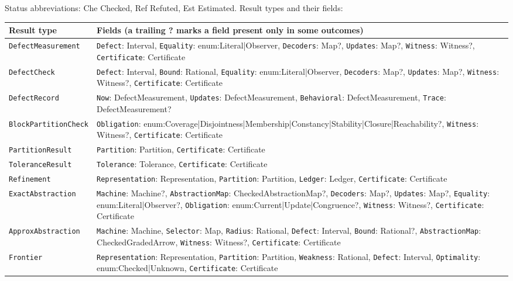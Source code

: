 \documentclass[11pt]{article}
\newcommand{\code}[1]{\texttt{#1}}
\theoremstyle{definition}
\theoremstyle{plain}
\begin{document}
Status abbreviations: Che Checked, Ref Refuted, Est Estimated. Result types and their fields:
{\footnotesize\begin{longtable}{>{\raggedright\arraybackslash}p{4.9cm}>{\raggedright\arraybackslash}p{9.1cm}}
\toprule Result type & Fields (a trailing ? marks a field present only in some outcomes)\\ \midrule \endhead
\code{DefectMeasurement} & \code{Defect}: Interval, \code{Equality}: enum:Literal|\allowbreak{}Observer, \code{Decoders}: Map?, \code{Updates}: Map?, \code{Witness}: Witness?, \code{Certificate}: Certificate\\
\code{DefectCheck} & \code{Defect}: Interval, \code{Bound}: Rational, \code{Equality}: enum:Literal|\allowbreak{}Observer, \code{Decoders}: Map?, \code{Updates}: Map?, \code{Witness}: Witness?, \code{Certificate}: Certificate\\
\code{DefectRecord} & \code{Now}: DefectMeasurement, \code{Updates}: DefectMeasurement, \code{Behavioral}: DefectMeasurement, \code{Trace}: DefectMeasurement?\\
\code{BlockPartitionCheck} & \code{Obligation}: enum:Coverage|\allowbreak{}Disjointness|\allowbreak{}Membership|\allowbreak{}Constancy|\allowbreak{}Stability|\allowbreak{}Closure|\allowbreak{}Reachability?, \code{Witness}: Witness?, \code{Certificate}: Certificate\\
\code{PartitionResult} & \code{Partition}: Partition, \code{Certificate}: Certificate\\
\code{ToleranceResult} & \code{Tolerance}: Tolerance, \code{Certificate}: Certificate\\
\code{Refinement} & \code{Representation}: Representation, \code{Partition}: Partition, \code{Ledger}: Ledger, \code{Certificate}: Certificate\\
\code{ExactAbstraction} & \code{Machine}: Machine?, \code{AbstractionMap}: CheckedAbstractionMap?, \code{Decoders}: Map?, \code{Updates}: Map?, \code{Equality}: enum:Literal|\allowbreak{}Observer?, \code{Obligation}: enum:Current|\allowbreak{}Update|\allowbreak{}Congruence?, \code{Witness}: Witness?, \code{Certificate}: Certificate\\
\code{ApproxAbstraction} & \code{Machine}: Machine, \code{Selector}: Map, \code{Radius}: Rational, \code{Defect}: Interval, \code{Bound}: Rational?, \code{AbstractionMap}: CheckedGradedArrow, \code{Witness}: Witness?, \code{Certificate}: Certificate\\
\code{Frontier} & \code{Representation}: Representation, \code{Partition}: Partition, \code{Weakness}: Rational, \code{Defect}: Interval, \code{Optimality}: enum:Checked|\allowbreak{}Unknown, \code{Certificate}: Certificate\\

\end{longtable}}
\end{document}

